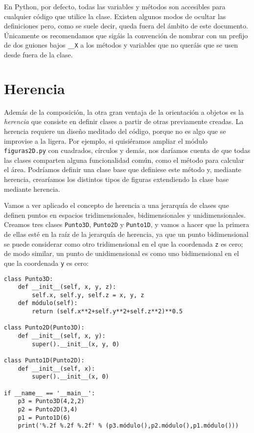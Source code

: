 En Python, por defecto, todas las variables y métodos son accesibles para cualquier código que utilice la clase. Existen algunos modos de ocultar las definiciones pero, como se suele decir, queda fuera del ámbito de este documento. Únicamente os recomendamos que sigáis la convención de nombrar con un prefijo de dos guiones bajos \texttt{\_\_X} a los métodos y variables que no queráis que se usen desde fuera de la clase.

\section{Herencia}

Además de la composición, la otra gran ventaja de la orientación a objetos es la \emph{herencia} que consiste en definir clases a partir de otras previamente creadas. La herencia requiere un diseño meditado del código, porque no es algo que se improvise a la ligera. Por ejemplo, si quisiéramos ampliar el módulo \texttt{figuras2D.py} con cuadrados, círculos y demás, nos daríamos cuenta de que todas las clases comparten alguna funcionalidad común, como el método para calcular el área. Podríamos definir una clase base que definiese este método y, mediante herencia, crearíamos los distintos tipos de figuras extendiendo la clase base mediante herencia.

Vamos a ver aplicado el concepto de herencia a una jerarquía de clases que definen puntos en espacios tridimensionales, bidimensionales y unidimensionales. Creamos tres clases \texttt{Punto3D}, \texttt{Punto2D} y \texttt{Punto1D}, y vamos a hacer que la primera de ellas esté en la raíz de la jerarquía de herencia, ya que un punto bidimensional se puede considerar como otro tridimensional en el que la coordenada \texttt{z} es cero; de modo similar, un punto de unidimensional es como uno bidimensional en el que la coordenada \texttt{y} es cero:

\begin{lstlisting}
class Punto3D:
    def __init__(self, x, y, z):
        self.x, self.y, self.z = x, y, z 
    def módulo(self):
        return (self.x**2+self.y**2+self.z**2)**0.5
		
class Punto2D(Punto3D):
    def __init__(self, x, y):
        super().__init__(x, y, 0)

class Punto1D(Punto2D):
    def __init__(self, x):
        super().__init__(x, 0)
		
if __name__ == '__main__':
    p3 = Punto3D(4,2,2)
    p2 = Punto2D(3,4)
    p1 = Punto1D(6)
    print('%.2f %.2f %.2f' % (p3.módulo(),p2.módulo(),p1.módulo()))
\end{lstlisting}

